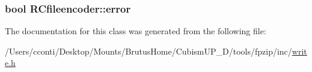 \subsubsection[{error}]{\setlength{\rightskip}{0pt plus 5cm}bool R\+Cfileencoder\+::error}\label{class_r_cfileencoder_af71a3ea93e37e3300ecb623e38b5b5da}


The documentation for this class was generated from the following file\+:\begin{DoxyCompactItemize}
\item 
/\+Users/cconti/\+Desktop/\+Mounts/\+Brutus\+Home/\+Cubism\+U\+P\+\_\+D/tools/fpzip/inc/\hyperlink{write_8h}{write.\+h}\end{DoxyCompactItemize}
